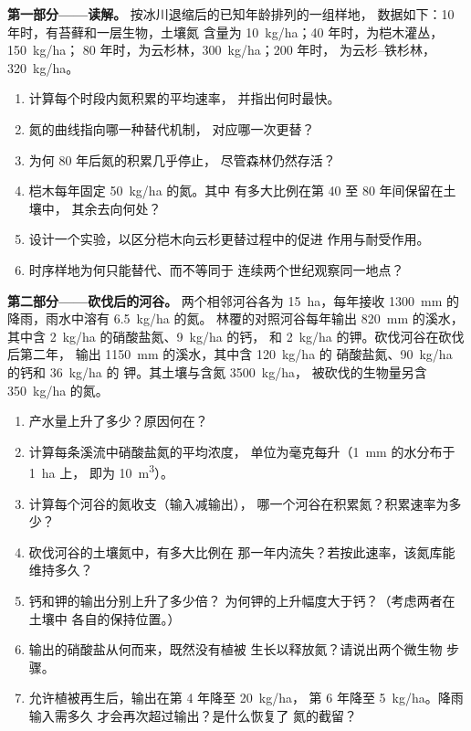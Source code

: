 \begin{problem}
\label{pb:b1:ecosystem-dynamics:1}

\medskip
\noindent\textbf{第一部分——读解。}
按冰川退缩后的已知年龄排列的一组样地，
数据如下：10 年时，有苔藓和一层生物，土壤氮
含量为 \qty{10}{kg/ha}；40 年时，为桤木灌丛，\qty{150}{kg/ha}；
80 年时，为云杉林，\qty{300}{kg/ha}；200 年时，
为云杉–铁杉林，\qty{320}{kg/ha}。
\begin{enumerate}
  \item 计算每个时段内氮积累的平均速率，
        并指出何时最快。
  \item 氮的曲线指向哪一种替代机制，
        对应哪一次更替？
  \item 为何 80 年后氮的积累几乎停止，
        尽管森林仍然存活？
  \item 桤木每年固定 \qty{50}{kg/ha} 的氮。其中
        有多大比例在第 40 至 80 年间保留在土壤中，
        其余去向何处？
  \item 设计一个实验，以区分桤木向云杉更替过程中的促进
        作用与耐受作用。
  \item 时序样地为何只能替代、而不等同于
        连续两个世纪观察同一地点？
\end{enumerate}

\medskip
\noindent\textbf{第二部分——砍伐后的河谷。}
两个相邻河谷各为 \qty{15}{ha}，每年接收 \qty{1300}{mm}
的降雨，雨水中溶有 \qty{6.5}{kg/ha} 的氮。
林覆的对照河谷每年输出 \qty{820}{mm} 的溪水，
其中含 \qty{2}{kg/ha} 的硝酸盐氮、\qty{9}{kg/ha} 的钙，
和 \qty{2}{kg/ha} 的钾。砍伐河谷在砍伐后第二年，
输出 \qty{1150}{mm} 的溪水，其中含 \qty{120}{kg/ha} 的
硝酸盐氮、\qty{90}{kg/ha} 的钙和 \qty{36}{kg/ha} 的
钾。其土壤与含氮 \qty{3500}{kg/ha}，
被砍伐的生物量另含 \qty{350}{kg/ha} 的氮。
\begin{enumerate}[resume]
  \item 产水量上升了多少？原因何在？
  \item 计算每条溪流中硝酸盐氮的平均浓度，
        单位为毫克每升（\qty{1}{mm} 的水分布于 \qty{1}{ha} 上，
        即为 \qty{10}{m^3}）。
  \item 计算每个河谷的氮收支（输入减输出），
        哪一个河谷在积累氮？积累速率为多少？
  \item 砍伐河谷的土壤氮中，有多大比例在
        那一年内流失？若按此速率，该氮库能维持多久？
  \item 钙和钾的输出分别上升了多少倍？
        为何钾的上升幅度大于钙？（考虑两者在土壤中
        各自的保持位置。）
  \item 输出的硝酸盐从何而来，既然没有植被
        生长以释放氮？请说出两个微生物
        步骤。
  \item 允许植被再生后，输出在第 4 年降至 \qty{20}{kg/ha}，
        第 6 年降至 \qty{5}{kg/ha}。降雨输入需多久
        才会再次超过输出？是什么恢复了
        氮的截留？
\end{enumerate}


\end{problem}
